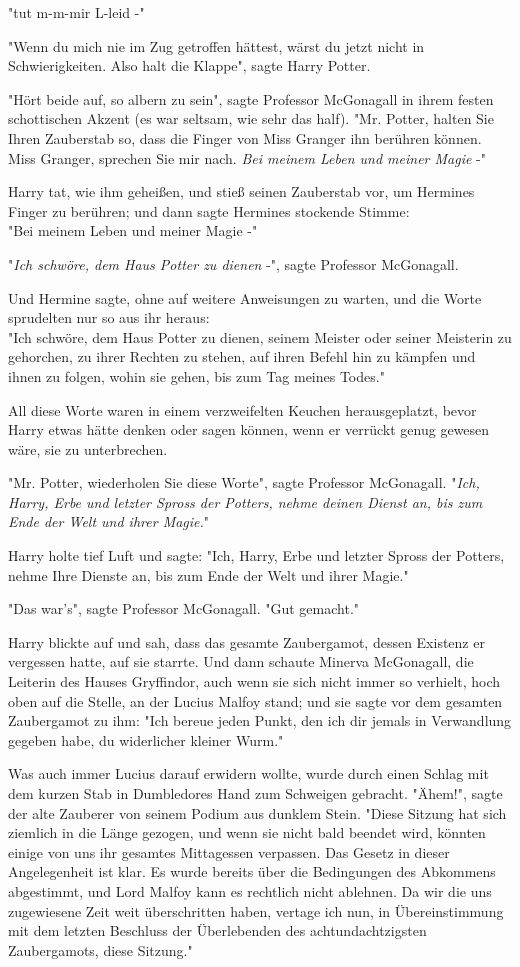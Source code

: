 {"tut m-m-mir L-leid -"

"Wenn du mich nie im Zug getroffen hättest, wärst du jetzt nicht in Schwierigkeiten. Also halt die Klappe", sagte Harry Potter.

"Hört beide auf, so albern zu sein", sagte Professor McGonagall in ihrem festen schottischen Akzent (es war seltsam, wie sehr das half). "Mr. Potter, halten Sie Ihren Zauberstab so, dass die Finger von Miss Granger ihn berühren können. Miss Granger, sprechen Sie mir nach. \emph{Bei meinem Leben und meiner Magie} -"

Harry tat, wie ihm geheißen, und stieß seinen Zauberstab vor, um Hermines Finger zu berühren; und dann sagte Hermines stockende Stimme:\\ "Bei meinem Leben und meiner Magie -"

"\emph{Ich schwöre, dem Haus Potter zu dienen} -", sagte Professor McGonagall.

Und Hermine sagte, ohne auf weitere Anweisungen zu warten, und die Worte sprudelten nur so aus ihr heraus:\\ "Ich schwöre, dem Haus Potter zu dienen, seinem Meister oder seiner Meisterin zu gehorchen, zu ihrer Rechten zu stehen, auf ihren Befehl hin zu kämpfen und ihnen zu folgen, wohin sie gehen, bis zum Tag meines Todes."

All diese Worte waren in einem verzweifelten Keuchen herausgeplatzt, bevor Harry etwas hätte denken oder sagen können, wenn er verrückt genug gewesen wäre, sie zu unterbrechen.

"Mr. Potter, wiederholen Sie diese Worte", sagte Professor McGonagall. "\emph{Ich, Harry, Erbe und letzter Spross der Potters, nehme deinen Dienst an, bis zum Ende der Welt und ihrer Magie.}"

Harry holte tief Luft und sagte: "Ich, Harry, Erbe und letzter Spross der Potters, nehme Ihre Dienste an, bis zum Ende der Welt und ihrer Magie."

"Das war's", sagte Professor McGonagall. "Gut gemacht."

Harry blickte auf und sah, dass das gesamte Zaubergamot, dessen Existenz er vergessen hatte, auf sie starrte. Und dann schaute Minerva McGonagall, die Leiterin des Hauses Gryffindor, auch wenn sie sich nicht immer so verhielt, hoch oben auf die Stelle, an der Lucius Malfoy stand; und sie sagte vor dem gesamten Zaubergamot zu ihm: "Ich bereue jeden Punkt, den ich dir jemals in Verwandlung gegeben habe, du widerlicher kleiner Wurm."

Was auch immer Lucius darauf erwidern wollte, wurde durch einen Schlag mit dem kurzen Stab in Dumbledores Hand zum Schweigen gebracht. "Ähem!", sagte der alte Zauberer von seinem Podium aus dunklem Stein. "Diese Sitzung hat sich ziemlich in die Länge gezogen, und wenn sie nicht bald beendet wird, könnten einige von uns ihr gesamtes Mittagessen verpassen. Das Gesetz in dieser Angelegenheit ist klar. Es wurde bereits über die Bedingungen des Abkommens abgestimmt, und Lord Malfoy kann es rechtlich nicht ablehnen. Da wir die uns zugewiesene Zeit weit überschritten haben, vertage ich nun, in Übereinstimmung mit dem letzten Beschluss der Überlebenden des achtundachtzigsten Zaubergamots, diese Sitzung."

}
